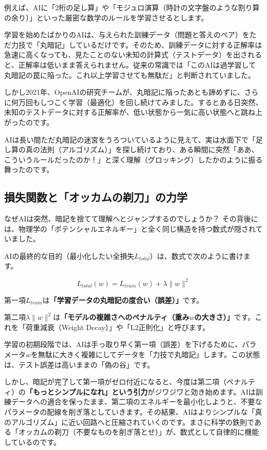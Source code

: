 例えば、AIに「2桁の足し算」や「モジュロ演算（時計の文字盤のような割り算の余り）」といった厳密な数学のルールを学習させるとします。

学習を始めたばかりのAIは、与えられた訓練データ（問題と答えのペア）をただ力技で「丸暗記」しているだけです。そのため、訓練データに対する正解率は急速に高くなっても、見たことのない未知の計算式（テストデータ）を出されると、正解率は低いまま答えられません。従来の常識では「このAIは過学習して丸暗記の罠に陥った。これ以上学習させても無駄だ」と判断されていました。

しかし2021年、OpenAIの研究チームが、丸暗記に陥ったあとも諦めずに、さらに何万回もしつこく学習（最適化）を回し続けてみました。するとある日突然、未知のテストデータに対する正解率が、低い状態から一気に高い状態へと跳ね上がったのです。

AIは長い間ただ丸暗記の迷宮をうろついているように見えて、実は水面下で「足し算の真の法則（アルゴリズム）」を探し続けており、ある瞬間に突然「ああ、こういうルールだったのか！」と深く理解（グロッキング）したかのように振る舞ったのです。

\subsection{損失関数と「オッカムの剃刀」の力学}

なぜAIは突然、暗記を捨てて理解へとジャンプするのでしょうか？ その背後には、物理学の「ポテンシャルエネルギー」と全く同じ構造を持つ数式が隠されていました。

AIの最終的な目的（最小化したい全損失\(L_{total}\)）は、数式で次のように書けます。

\[L_{total}(w) = L_{train}(w) + \lambda \|w\|^2\]

第一項\(L_{train}\)は\textbf{「学習データの丸暗記の度合い（誤差）」}です。

第二項\(\lambda \|w\|^2\)は\textbf{「モデルの複雑さへのペナルティ（重み\(w\)の大きさ）」}です。これを「荷重減衰（Weight Decay）」や「L2正則化」と呼びます。

学習の初期段階では、AIは手っ取り早く第一項（誤差）を下げるために、パラメータ\(w\)を無駄に大きく複雑にしてデータを「力技で丸暗記」します。この状態は、テスト誤差は高いままの「偽の谷」です。

しかし、暗記が完了して第一項がゼロ付近になると、今度は第二項（ペナルティ）の\textbf{「もっとシンプルになれ」という引力}がジワジワと効き始めます。AIは訓練データへの適合を保ったまま、第二項のエネルギーを最小化しようと、不要なパラメータの配線を削ぎ落としていきます。その結果、AIはよりシンプルな「真のアルゴリズム」に近い回路へと圧縮されていくのです。まさに科学の鉄則である「オッカムの剃刀（不要なものを削ぎ落とせ）」が、数式として自律的に機能しているのです。

